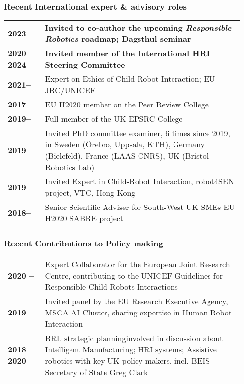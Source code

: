 \subsubsection{Recent International expert \& advisory roles}

\begin{tabular}{p{0.15\linewidth}p{0.8\linewidth}}
    {\bf 2023} & {\bf Invited to co-author the upcoming \emph{Responsible
    Robotics} roadmap; Dagsthul seminar}  \\
    {\bf 2020--2024} & {\bf Invited member of the International HRI Steering Committee} \\
    {\bf 2021--} & {Expert on Ethics of Child-Robot Interaction; EU JRC/UNICEF} \\
    {\bf 2017--} & {EU H2020 member on the Peer Review College} \\
    {\bf 2019--} & {Full member of the UK EPSRC College} \\
    {\bf 2019--} & {Invited PhD committee examiner, 6 times since 2019, in Sweden
(Örebro, Uppsala, KTH), Germany (Bielefeld), France (LAAS-CNRS), UK (Bristol
Robotics Lab)} \\
    {\bf 2019} & {Invited Expert in Child-Robot Interaction, robot4SEN project,
	VTC, Hong Kong} \\
    {\bf 2018--} & {Senior Scientific Adviser for South-West UK SMEs} {EU H2020 SABRE project} \\
\end{tabular}

\subsubsection{Recent Contributions to Policy making}

\begin{tabular}{p{0.15\linewidth}p{0.8\linewidth}}
    {\bf 2020 --} & {Expert Collaborator for the European Joint Research
Centre, contributing to the UNICEF Guidelines for Responsible Child-Robots
Interactions} \\
    {\bf 2019} & {Invited panel by the EU Research Executive Agency, MSCA AI
Cluster, sharing expertise in Human-Robot Interaction} \\
    {\bf 2018--2020} & {BRL strategic planning}{involved in discussion about
Intelligent Manufacturing; HRI systems; Assistive robotics with key UK policy
makers, incl. BEIS Secretary of State Greg Clark} \\
\end{tabular}

